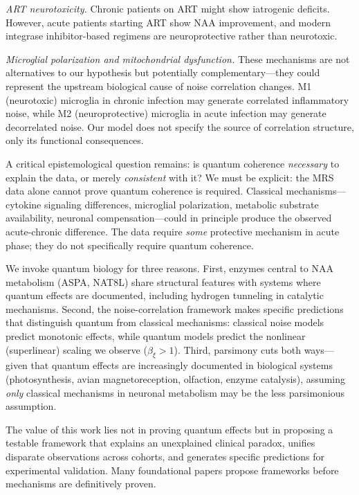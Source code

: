 \documentclass[10pt,a4paper]{article}
\begin{document}
\textit{ART neurotoxicity.} Chronic patients on ART might show iatrogenic deficits. However, acute patients starting ART show NAA improvement, and modern integrase inhibitor-based regimens are neuroprotective rather than neurotoxic.

\textit{Microglial polarization and mitochondrial dysfunction.} These mechanisms are not alternatives to our hypothesis but potentially complementary---they could represent the upstream biological cause of noise correlation changes. M1 (neurotoxic) microglia in chronic infection may generate correlated inflammatory noise, while M2 (neuroprotective) microglia in acute infection may generate decorrelated noise. Our model does not specify the source of correlation structure, only its functional consequences.

A critical epistemological question remains: is quantum coherence \textit{necessary} to explain the data, or merely \textit{consistent} with it? We must be explicit: the MRS data alone cannot prove quantum coherence is required. Classical mechanisms---cytokine signaling differences, microglial polarization, metabolic substrate availability, neuronal compensation---could in principle produce the observed acute-chronic difference. The data require \textit{some} protective mechanism in acute phase; they do not specifically require quantum coherence.

We invoke quantum biology for three reasons. First, enzymes central to NAA metabolism (ASPA, NAT8L) share structural features with systems where quantum effects are documented, including hydrogen tunneling in catalytic mechanisms. Second, the noise-correlation framework makes specific predictions that distinguish quantum from classical mechanisms: classical noise models predict monotonic effects, while quantum models predict the nonlinear (superlinear) scaling we observe ($\beta_\xi > 1$). Third, parsimony cuts both ways---given that quantum effects are increasingly documented in biological systems (photosynthesis, avian magnetoreception, olfaction, enzyme catalysis), assuming \textit{only} classical mechanisms in neuronal metabolism may be the less parsimonious assumption.

The value of this work lies not in proving quantum effects but in proposing a testable framework that explains an unexplained clinical paradox, unifies disparate observations across cohorts, and generates specific predictions for experimental validation. Many foundational papers propose frameworks before mechanisms are definitively proven.
\end{document}
